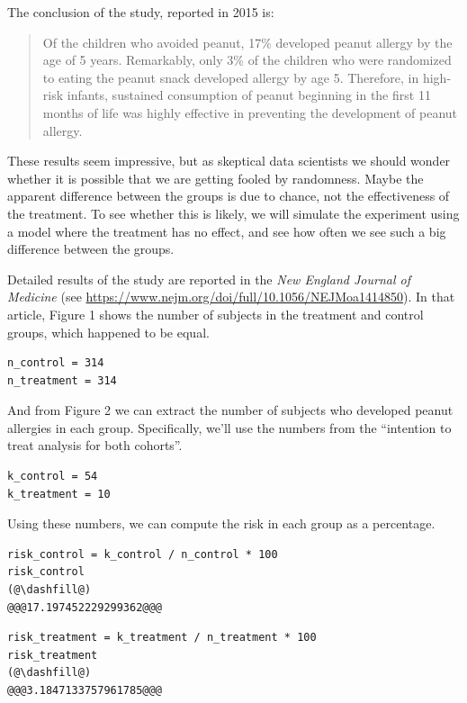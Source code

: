 The conclusion of the study, reported in 2015 is:

\begin{quote}
Of the children who avoided peanut, 17\% developed peanut allergy by the
age of 5 years. Remarkably, only 3\% of the children who were randomized
to eating the peanut snack developed allergy by age 5. Therefore, in
high-risk infants, sustained consumption of peanut beginning in the
first 11 months of life was highly effective in preventing the
development of peanut allergy.
\end{quote}

These results seem impressive, but as skeptical data scientists we
should wonder whether it is possible that we are getting fooled by
randomness. Maybe the apparent difference between the groups is due to
chance, not the effectiveness of the treatment. To see whether this is
likely, we will simulate the experiment using a model where the
treatment has no effect, and see how often we see such a big difference
between the groups.

Detailed results of the study are reported in the \emph{New England
Journal of Medicine} (see
\url{https://www.nejm.org/doi/full/10.1056/NEJMoa1414850}). In that
article, Figure 1 shows the number of subjects in the treatment and
control groups, which happened to be equal.

\begin{lstlisting}[]
n_control = 314
n_treatment = 314
\end{lstlisting}

And from Figure 2 we can extract the number of subjects who developed
peanut allergies in each group. Specifically, we'll use the numbers from
the ``intention to treat analysis for both cohorts''.

\begin{lstlisting}[]
k_control = 54
k_treatment = 10
\end{lstlisting}

Using these numbers, we can compute the risk in each group as a
percentage.

\begin{lstlisting}[]
risk_control = k_control / n_control * 100
risk_control
(@\dashfill@)
@@@17.197452229299362@@@
\end{lstlisting}

\begin{lstlisting}[]
risk_treatment = k_treatment / n_treatment * 100
risk_treatment
(@\dashfill@)
@@@3.1847133757961785@@@
\end{lstlisting}

